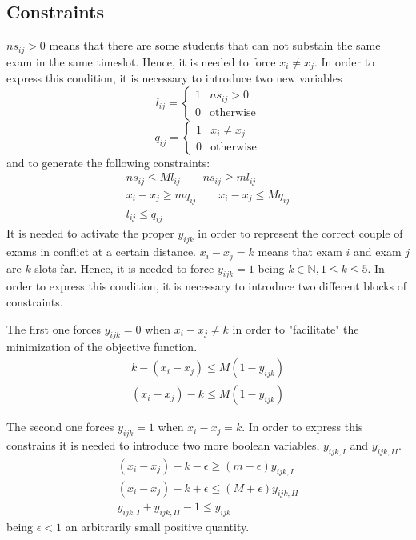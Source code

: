 \subsection*{Constraints}
$ ns_{ij} > 0 $ means that there are some students that can not substain the same exam in the same timeslot. Hence, it is needed to force $ x_{i} \ne x_{j} $.
In order to express this condition, it is necessary to introduce two new variables
\[
l_{ij} = 
\begin{cases}
1	&	ns_{ij} > 0	\\
0	&	\text{otherwise}
\end{cases}
\]
\[
q_{ij} = 
\begin{cases}
1	&	x_{i} \ne x_{j}	\\
0	&	\text{otherwise}
\end{cases}
\]
and to generate the following constraints:
\begin{gather*}
ns_{ij} \le M l_{ij} \qquad ns_{ij} \ge m l_{ij} \\
x_{i} - x_{j} \ge m q_{ij} \qquad x_{i} - x_{j} \le M q_{ij} \\
l_{ij} \le q_{ij}
\end{gather*}
\newline
It is needed to activate the proper $ y_{ijk} $ in order to represent the correct couple of exams in conflict at a certain distance.
\newline
$ x_{i} - x_{j} = k $ means that exam $i$ and exam $j$ are $k$ slots far. Hence, it is needed to force $ y_{ijk} = 1 $ being $ k \in \mathbb{N}, 1 \le k \le 5 $.
In order to express this condition, it is necessary to introduce two different blocks of constraints.

The first one forces $ y_{ijk} = 0 $ when $ x_{i} - x_{j} \ne k $ in order to "facilitate" the minimization of the objective function.
\begin{gather*}
k - (x_{i} - x_{j}) \le M (1-y_{ijk}) \\
(x_{i} - x_{j}) - k \le M (1-y_{ijk})
\end{gather*}

The second one forces $ y_{ijk} = 1 $ when $ x_{i} - x_{j} = k $.
In order to express this constrains it is needed to introduce two more boolean variables, $ y_{ijk, I} $ and $ y_{ijk, II} $.
\begin{gather}
\label{eqn:1}
(x_{i} - x_{j}) - k - \epsilon \ge (m - \epsilon) y_{ijk, I} \\
\label{eqn:2}
(x_{i} - x_{j}) - k + \epsilon \le (M + \epsilon) y_{ijk, II} \\
\label{eqn:3}
y_{ijk, I} + y_{ijk, II} - 1 \le y_{ijk}
\end{gather}
being $ \epsilon < 1 $ an arbitrarily small positive quantity.

